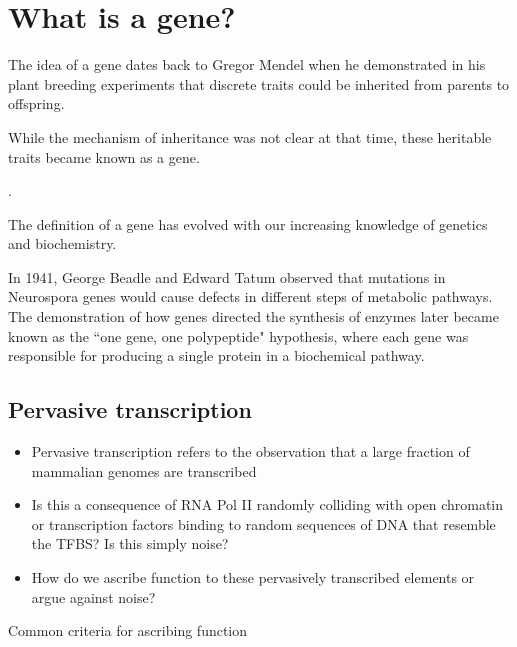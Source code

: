 \section{What is a gene?}

The idea of a gene dates back to Gregor Mendel when he demonstrated in his plant breeding experiments that discrete traits could be inherited from parents to offspring. 

While the mechanism of inheritance was not clear at that time, these heritable traits became known as a gene.

\cite{pmid17571346}.

The definition of a gene has evolved with our increasing knowledge of genetics and biochemistry\cite{pmid17567988}.

In 1941, George Beadle and Edward Tatum observed that mutations in Neurospora genes would cause defects in different steps of metabolic pathways\cite{Beadle15111941}. The demonstration of how genes directed the synthesis of enzymes later became known as the ``one gene, one polypeptide" hypothesis, where each gene was responsible for producing a single protein in a biochemical pathway.

\subsection{Pervasive transcription}

\begin{itemize}
   \item Pervasive transcription refers to the observation that a large fraction of mammalian genomes are transcribed
   \item Is this a consequence of RNA Pol II randomly colliding with open chromatin or transcription factors binding to random sequences of DNA that resemble the TFBS? Is this simply noise?
   \item How do we ascribe function to these pervasively transcribed elements or argue against noise?
\end{itemize}

Common criteria for ascribing function

